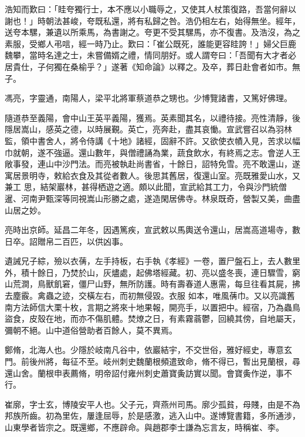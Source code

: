 \begin{pinyinscope}
 浩知而歎曰：「眭夸獨行士，本不應以小職辱之，又使其人杖策復路，吾當何辭以謝也！」時朝法甚峻，夸既私還，將有私歸之咎。浩仍相左右，始得無坐。經年，送夸本騾，兼遺以所乘馬，為書謝之。夸更不受其騾馬，亦不復書。及浩沒，為之素服，受鄉人弔唁，經一時乃止。歎曰：「崔公既死，誰能更容眭誇！」婦父巨鹿魏攀，當時名達之士，未嘗備婿之禮，情同朋好。或人謂夸曰：「吾聞有大才者必居貴仕，子何獨在桑榆乎？」遂著《知命論》以釋之。及卒，葬日赴會者如市。無子。



 馮亮，字靈通，南陽人，梁平北將軍蔡道恭之甥也。少博覽諸書，又篤好佛理。



 隨道恭至義陽，會中山王英平義陽，獲焉。英素聞其名，以禮待接。亮性清靜，後隱居嵩山，感英之德，以時展覲。英亡，亮奔赴，盡其哀慟。宣武嘗召以為羽林監，領中書舍人，將令侍講《十地》諸經，固辭不許。又欲使衣幘入見，苦求以幅巾就朝，遂不強逼。還山數年，與僧禮誦為業，蔬食飲水，有終焉之志。會逆人王敞事發，連山中沙門法。而亮被執赴尚書省，十餘日，詔特免雪。亮不敢還山，遂寓居景明寺，敕給衣食及其從者數人。後思其舊居，復還山室。亮既雅愛山水，又兼工
 思，結架巖林，甚得栖遊之適。頗以此聞，宣武給其工力，令與沙門統僧暹、河南尹甄深等同視嵩山形勝之處，遂造閑居佛寺。林泉既奇，營製又美，曲盡山居之妙。



 亮時出京師。延昌二年冬，因遇篤疾，宣武敕以馬輿送令還山，居嵩高道場寺，數日卒。詔贈帛二百匹，以供凶事。



 遺誡兄子綜，殮以衣蒨，左手持板，右手執《孝經》一卷，置尸盤石上，去人數里外，積十餘日，乃焚於山，灰燼處，起佛塔經藏。初、亮以盛冬喪，連日驟雪，窮山荒澗，鳥獸飢窘，僵尸山野，無所防護。時有壽春道人惠需，每旦往看其屍，拂去塵霰。禽蟲之迹，交橫左右，而初無侵毀。衣服
 如本，唯風蒨巾。又以亮識舊南方法師信大栗十枚，言期之將來十地果報，開亮手，以置把中。經宿，乃為蟲鳥盜食，皮殼在地，而亦不傷肌體。焚燎之日，有素霧蓊鬱，回繞其傍，自地屬天，彌朝不絕。山中道俗營助者百餘人，莫不異焉。



 鄭脩，北海人也。少隱於岐南凡谷中，依巖結宇，不交世俗，雅好經史，專意玄門。前後州將，每征不至。岐州刺史魏蘭根頻遣致命，脩不得已，暫出見蘭根，尋還山舍。蘭根申表薦脩，明帝詔付雍州刺史蕭寶夤訪實以聞。會寶夤作逆，事不行。



 崔廓，字士玄，博陵安平人也。父子元，齊燕州司馬。廓少孤貧，母賤，由是不為邦族所齒。初為里佐，屢逢屈辱，於是感激，逃入山中。遂博覽書籍，多所通涉，山東學者皆宗之。既還鄉，不應辟命。與趙郡李士謙為忘言友，時稱崔、李。




\end{pinyinscope}
